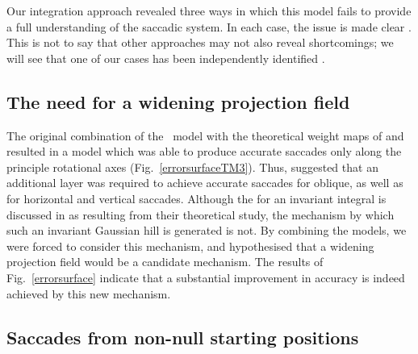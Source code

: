 \documentclass{frontiersSCNS}
\begin{document}
Our integration approach revealed three ways in which this model fails
to provide a full understanding of the saccadic system. In each case,
the issue is made clear . This is
not to say that other approaches may not also reveal shortcomings; we
will see that one of our cases has been independently identified
\citep{groh_effects_2011}.

\subsection{The need for a widening projection field}

The original combination of the \ccg~model with the theoretical weight
maps of \cite{ottes_visuomotor_1986} and \cite{tabareau_geometry_2007}
resulted in a model which was able to produce accurate saccades only
along the principle rotational axes
(Fig.~\ref{errorsurfaceTM3}). Thus, 
suggested that an additional layer was required to achieve accurate
saccades for oblique, as well as for horizontal and vertical
saccades. Although the  for an invariant integral is discussed
in \cite{tabareau_geometry_2007} as resulting from their theoretical
study, the mechanism by which such an invariant Gaussian hill is
generated is not. By combining the models, we were forced to consider
this mechanism, and hypothesised that a widening projection field
would be a candidate mechanism. The results of Fig.~\ref{errorsurface}
indicate that a substantial improvement in accuracy is indeed achieved
by this new mechanism.

\subsection{Saccades from non-null starting positions}
\end{document}
